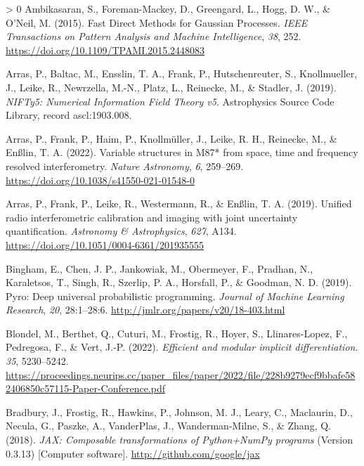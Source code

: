 \documentclass[10pt,a4paper,onecolumn]{article}
\newlength{\cslhangindent}
\newenvironment{CSLReferences}[3] %
 {%
  \setlength{\parindent}{0pt}
  \ifodd #1 \everypar{\setlength{\hangindent}{\cslhangindent}}\ignorespaces\fi
  \ifnum #2 > 0
  \setlength{\parskip}{#2\baselineskip}
  \fi
 }%
 {}
\begin{document}
\hypertarget{refs}{}
\begin{CSLReferences}{1}{0}
\leavevmode\hypertarget{ref-Sivaram2015}{}%
Ambikasaran, S., Foreman-Mackey, D., Greengard, L., Hogg, D. W., \&
O'Neil, M. (2015). {Fast Direct Methods for Gaussian Processes}.
\emph{IEEE Transactions on Pattern Analysis and Machine Intelligence},
\emph{38}, 252. \url{https://doi.org/10.1109/TPAMI.2015.2448083}

\leavevmode\hypertarget{ref-Arras2019NIFTy}{}%
Arras, P., Baltac, M., Ensslin, T. A., Frank, P., Hutschenreuter, S.,
Knollmueller, J., Leike, R., Newrzella, M.-N., Platz, L., Reinecke, M.,
\& Stadler, J. (2019). \emph{{NIFTy5: Numerical Information Field Theory
v5}}. Astrophysics Source Code Library, record ascl:1903.008.

\leavevmode\hypertarget{ref-Arras2022}{}%
Arras, P., Frank, P., Haim, P., Knollmüller, J., Leike, R. H., Reinecke,
M., \& Enßlin, T. A. (2022). {Variable structures in M87* from space,
time and frequency resolved interferometry}. \emph{Nature Astronomy},
\emph{6}, 259--269. \url{https://doi.org/10.1038/s41550-021-01548-0}

\leavevmode\hypertarget{ref-Arras2019}{}%
Arras, P., Frank, P., Leike, R., Westermann, R., \& Enßlin, T. A.
(2019). {Unified radio interferometric calibration and imaging with
joint uncertainty quantification}. \emph{Astronomy \& Astrophysics},
\emph{627}, A134. \url{https://doi.org/10.1051/0004-6361/201935555}

\leavevmode\hypertarget{ref-Bingham2019}{}%
Bingham, E., Chen, J. P., Jankowiak, M., Obermeyer, F., Pradhan, N.,
Karaletsos, T., Singh, R., Szerlip, P. A., Horsfall, P., \& Goodman, N.
D. (2019). Pyro: Deep universal probabilistic programming. \emph{Journal
of Machine Learning Research}, \emph{20}, 28:1--28:6.
\url{http://jmlr.org/papers/v20/18-403.html}

\leavevmode\hypertarget{ref-Blondel2021}{}%
Blondel, M., Berthet, Q., Cuturi, M., Frostig, R., Hoyer, S.,
Llinares-Lopez, F., Pedregosa, F., \& Vert, J.-P. (2022).
\emph{Efficient and modular implicit differentiation}. \emph{35},
5230--5242.
\url{https://proceedings.neurips.cc/paper_files/paper/2022/file/228b9279ecf9bbafe582406850c57115-Paper-Conference.pdf}

\leavevmode\hypertarget{ref-Jax2018}{}%
Bradbury, J., Frostig, R., Hawkins, P., Johnson, M. J., Leary, C.,
Maclaurin, D., Necula, G., Paszke, A., VanderPlas, J., Wanderman-Milne,
S., \& Zhang, Q. (2018). \emph{{JAX}: Composable transformations of
{P}ython+{N}um{P}y programs} (Version 0.3.13) {[}Computer software{]}.
\url{http://github.com/google/jax}


\end{CSLReferences}
\end{document}
